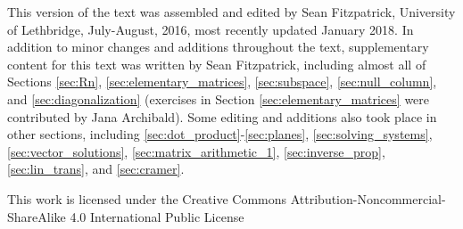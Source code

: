 \vspace{1in}


This version of the text was assembled and edited by Sean Fitzpatrick, University of Lethbridge, July-August, 2016, most recently updated January 2018. In addition to minor changes and additions throughout the text, supplementary content for this text was written by Sean Fitzpatrick, including almost all of Sections \ref{sec:Rn}, \ref{sec:elementary_matrices}, \ref{sec:subspace}, \ref{sec:null_column}, and \ref{sec:diagonalization} (exercises in Section \ref{sec:elementary_matrices} were contributed by Jana Archibald). Some editing and additions also took place in other sections, including \ref{sec:dot_product}-\ref{sec:planes}, \ref{sec:solving_systems}, \ref{sec:vector_solutions}, \ref{sec:matrix_arithmetic_1}, \ref{sec:inverse_prop}, \ref{sec:lin_trans}, and \ref{sec:cramer}.

\medskip

This work is licensed under the Creative Commons Attribution-Noncommercial-ShareAlike 4.0 International Public License

